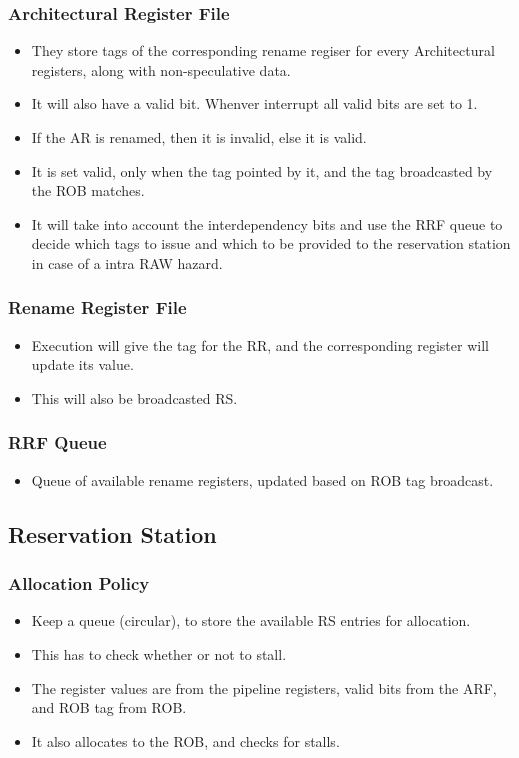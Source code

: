 \documentclass{article}
\begin{document}
\subsubsection{Architectural Register File}
\begin{itemize}
\item They store tags of the corresponding rename regiser for every Architectural registers, along with non-speculative data.
\item It will also have a valid bit. Whenver interrupt all valid bits are set to 1.
\item If the AR is renamed, then it is invalid, else it is valid.
\item It is set valid, only when the tag pointed by it, and the tag broadcasted by the ROB matches.
\item It will take into account the interdependency bits and use the RRF queue to decide which tags to issue and which to be provided to the 
reservation station in case of a intra RAW hazard.
\end{itemize}
\subsubsection{Rename Register File}
\begin{itemize}
\item Execution will give the tag for the RR, and the corresponding register will update its value.
\item This will also be broadcasted RS.
\end{itemize}
\subsubsection{RRF Queue}
\begin{itemize}
\item Queue of available rename registers, updated based on ROB tag broadcast.
\end{itemize}
\subsection{Reservation Station}
\subsubsection{Allocation Policy}
\begin{itemize}
\item Keep a queue (circular), to store the available RS entries for allocation.
\item This has to check whether or not to stall.
\item The register values are from the pipeline registers, valid bits from the ARF, and ROB tag from ROB.
\item It also allocates to the ROB, and checks for stalls.
\end{itemize}
\end{document}
